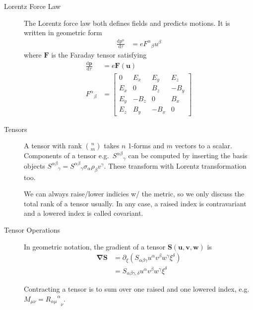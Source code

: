 \documentclass[12pt]{report}
\newcommand{\rd}[2]{\frac{\mathrm{d}#1}{\mathrm{d}#2}}
\begin{document}
\begin{description}
    \item[Lorentz Force Law] The Lorentz force law both defines fields and
        predicts motions. It is written in geometric form
        \begin{align}
            \rd{p^\alpha}{\tau} &= e{F^\alpha}_\beta u^\beta
        \end{align}
        where $\mathbf{F}$ is the Faraday tensor satisfying
        \begin{align}
            \rd{\mathbf{p}}{\tau} &= e\mathbf{F}(\mathbf{u})\\
            {F^\alpha}_\beta &= \begin{bmatrix}
            0 & E_x & E_y & E_z\\
            E_x & 0 & B_z & -B_y\\
            E_y & -B_z & 0 & B_x\\
            E_z & B_y & -B_x & 0
            \end{bmatrix}
        \end{align}

    \item[Tensors] A tensor with rank $\binom{n}{m}$ takes $n$ 1-forms and $m$
        vectors to a scalar. Components of a tensor e.g.\
        ${S^{\alpha\beta}}_\gamma$ can be computed by inserting the basis objects
        ${S^{\alpha\beta}}_\gamma = {S^{\alpha\beta}}_\gamma \sigma_\alpha
        \rho_\beta v^\gamma$. These transform with Lorentz transformation too.

        We can always raise/lower indicies w/ the metric, so we only discuss the
        total rank of a tensor usually. In any case, a raised index is
        contravariant and a lowered index is called covariant.

    \item[Tensor Operations] In geometric notation, the gradient of a tensor
        $\mathbf{S}(\mathbf{u}, \mathbf{v}, \mathbf{w})$ is
        \begin{align}
            \mathbf{\nabla}\mathbf{S} &= \partial_\xi \left(
            S_{\alpha\beta\gamma} u^\alpha v^\beta w^\gamma \xi^\delta \right)
            \nonumber\\
            &= S_{\alpha\beta\gamma, \delta}u^\alpha v^\beta w^\gamma\xi^\delta
        \end{align}

        Contracting a tensor is to sum over one raised and one lowered index,
        e.g. $M_{\mu\nu} = {{R_{\alpha \mu}}^\alpha}_{\nu}$.


\end{description}
\end{document}
